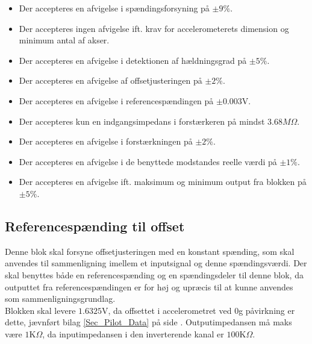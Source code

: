 \begin{itemize}
	\item Der accepteres en afvigelse i spændingsforsyning på $\pm9\%$.
	\item Der accepteres ingen afvigelse ift. krav for accelerometerets dimension og minimum antal af akser.
	\item Der accepteres en afvigelse i detektionen af hældningsgrad på $\pm5\%$.
	\item Der accepteres en afvigelse af offsetjusteringen på $\pm2\%$.
	\item Der accepteres en afvigelse i referencespændingen på $\pm0.003$V.
	\item Der accepteres kun en indgangsimpedans i forstærkeren på mindst $3.68M\Omega$.
	\item Der accepteres en afvigelse i forstærkningen på $\pm2\%$.
	\item Der accepteres en afvigelse i de benyttede modstandes reelle værdi på $\pm1\%$.
	\item Der accepteres en afvigelse ift. maksimum og minimum output fra blokken på $\pm5\%$.
\end{itemize}
\subsection{Referencespænding til offset}\label{Ref_Offset_Afs}
Denne blok skal forsyne offsetjusteringen med en konstant spænding, som skal anvendes til sammenligning imellem et inputsignal og denne spændingsværdi. Der skal benyttes både en referencespænding og en spændingsdeler til denne blok, da outputtet fra referencespændingen er for høj og upræcis til at kunne anvendes som sammenligningsgrundlag. \\
Blokken skal levere $1.6325$V, da offsettet i accelerometret ved $0$g påvirkning er dette, jævnført bilag \ref{Sec_Pilot_Data} på side \pageref{Sec_Pilot_Data}. Outputimpedansen må maks være $1$K$\Omega$, da inputimpedansen i den inverterende kanal er $100$K$\Omega$.

